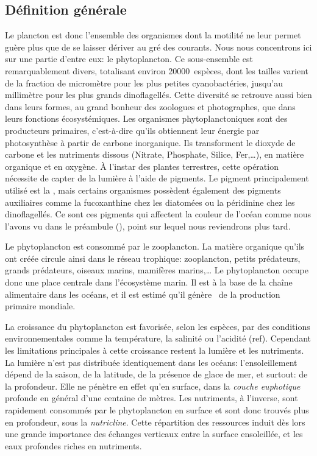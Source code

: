 \subsection{Définition générale}
\label{sec:phyto-def-gen}

Le plancton est donc l'ensemble des organismes dont la motilité ne leur permet guère plus que de se laisser dériver au gré des courants.
Nous nous concentrons ici sur une partie d'entre eux: le phytoplancton.
Ce sous-ensemble est remarquablement divers, totalisant environ \num{20 000}~espèces, dont les tailles varient de la fraction de micromètre pour les plus petites cyanobactéries, jusqu'au millimètre pour les plus grands dinoflagellés.
Cette diversité se retrouve aussi bien dans leurs formes, au grand bonheur des zoologues et photographes, que dans leurs fonctions écosystémiques.
Les organismes phytoplanctoniques sont des producteurs primaires, c'est-à-dire qu'ils obtiennent leur énergie par photosynthèse à partir de carbone inorganique.
Ils transforment le dioxyde de carbone et les nutriments dissous (Nitrate, Phosphate, Silice, Fer,\dots), en matière organique et en oxygène.
À l'instar des plantes terrestres, cette opération nécessite de capter de la lumière à l'aide de pigments.
Le pigment principalement utilisé est la , mais certains organismes possèdent également des pigments auxiliaires comme la fucoxanthine chez les diatomées ou la péridinine chez les dinoflagellés.
Ce sont ces pigments qui affectent la couleur de l'océan comme nous l'avons vu dans le préambule (), point sur lequel nous reviendrons plus tard.

Le phytoplancton est consommé par le zooplancton. La matière organique qu'ils ont créée circule ainsi dans le réseau trophique: zooplancton, petits prédateurs, grands prédateurs, oiseaux marins, mamifères marins,\dots
Le phytoplancton occupe donc une place centrale dans l'écosystème marin.
Il est à la base de la chaîne alimentaire dans les océans, et il est estimé qu'il génère~ de la production primaire mondiale.

La croissance du phytoplancton est favorisée, selon les espèces, par des conditions environnementales comme la température, la salinité ou l'acidité (ref).
Cependant les limitations principales à cette croissance restent la lumière et les nutriments.
La lumière n'est pas distribuée identiquement dans les océans: l'ensoleillement dépend de la saison, de la latitude, de la présence de glace de mer, et surtout: de la profondeur.
Elle ne pénètre en effet qu'en surface, dans la \emph{couche euphotique} profonde en général d'une centaine de mètres.
Les nutriments, à l'inverse, sont rapidement consommés par le phytoplancton en surface et sont donc trouvés plus en profondeur, sous la \emph{nutricline}.
Cette répartition des ressources induit dès lors une grande importance des échanges verticaux entre la surface ensoleillée, et les eaux profondes riches en nutriments.

